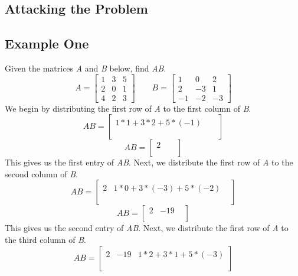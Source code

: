 \documentclass[12pt]{article}
\begin{document}
\newpage %


\begin{center}
\section{Attacking the Problem}
\end{center}
\subsection{Example One}
Given the matrices \textit{A} and \textit{B} below, find \textit{AB}.
\[
A = 
\begin{bmatrix}
    1 & 3 & 5 \\
    2 & 0 & 1 \\
    4 & 2 & 3
\end{bmatrix}
\qquad %
B = 
\begin{bmatrix}
    1 & 0 & 2 \\
    2 & -3 & 1 \\
    -1 & -2 & -3
\end{bmatrix}
\]
We begin by distributing the first row of \textit{A} to the first column of \textit{B}.
\[
AB = 
\begin{bmatrix}
    1*1+3*2+5*(-1)  &  &  \\
     &  &  \\
     &  & 
\end{bmatrix}
\]
\[
AB = 
\begin{bmatrix}
    2  &  &  \\
     &  &  \\
     &  & 
\end{bmatrix}
\]
This gives us the first entry of \textit{AB}. Next, we distribute the first row of \textit{A} to the second column of \textit{B}.
\[
AB = 
\begin{bmatrix}
    2  & 1*0+3*(-3)+5*(-2) &  \\
     &  &  \\
     &  & 
\end{bmatrix}
\]
\[
AB = 
\begin{bmatrix}
    2  & -19 &  \\
     &  &  \\
     &  & 
\end{bmatrix}
\]
This gives us the second entry of \textit{AB}. Next, we distribute the first row of \textit{A} to the third column of \textit{B}.
\[
AB = 
\begin{bmatrix}
    2  & -19 & 1*2+3*1+5*(-3) \\
     &  &  \\
     &  & 
\end{bmatrix}
\]
\end{document}
